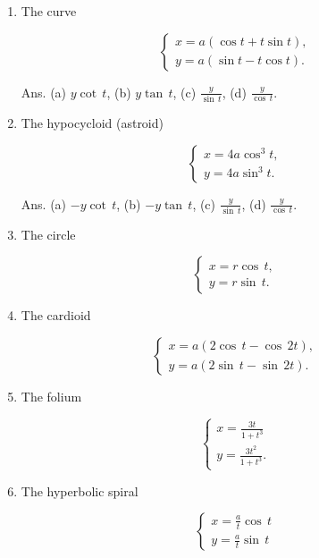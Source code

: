 \begin{enumerate}
\addtocounter{enumi}{15}

\item
The curve 	

\[
\begin{cases} 
x = a(\cos t + t \sin t), \\ 
y = a(\sin t - t \cos t). 
\end{cases}
\]

Ans. (a) $y\cot\, t$, (b) $y\tan\, t$, (c) $\frac{y}{\sin\, t}$, 
(d) $\frac{y}{\cos\, t}$.

\item
The hypocycloid (astroid) 	

\[
\begin{cases} 
x = 4 a \cos^3 t, \\ 
y = 4a \sin^3 t. 
\end{cases}
\]

Ans. (a) $- y\cot\, t$, (b) $- y\tan\, t$, (c) $\frac{y}{\sin\, t}$, 
(d) $\frac{y}{\cos\, t}$.

\item
The circle 	

\[
\begin{cases} x = r \cos\, t, \\ 
y = r \sin\, t. 
\end{cases}
\]

\item
The cardioid 	

\[
\begin{cases} 
x = a(2 \cos\, t - \cos\, 2t), \\ 
y = a(2 \sin\, t - \sin\, 2t). 
\end{cases}
\]

\item
The folium 

\[
\begin{cases} 
x = \frac{3t}{1 + t^3} \\ 
y = \frac{3t^2}{1 + t^3}.
\end{cases}
\]

\item
The hyperbolic spiral 	

\[
\begin{cases} 
x = \frac{a}{t} \cos\, t \\ 
y = \frac{a}{t} \sin\, t 
\end{cases}
\]

\end{enumerate}

